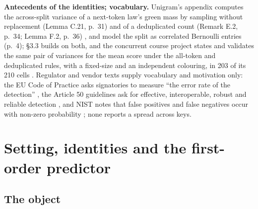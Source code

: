 \documentclass[11pt,letterpaper]{article}
\begin{document}
\textbf{Antecedents of the identities; vocabulary.} Unigram's appendix computes the across-split variance of a next-token law's green mass by sampling without replacement (Lemma C.21, p.~31) and of a deduplicated count (Remark E.2, p.~34; Lemma F.2, p.~36) \citep{zhao2024unigram}, and \citet{gloaguen2026unified} model the split as correlated Bernoulli entries (p.~4); \S{}3.3 builds on both, and the concurrent course project states and validates the same pair of variances for the mean score under the all-token and deduplicated rules, with a fixed-size and an independent colouring, in 203 of its 210 cells \citep{yukhimchuk2026keylottery}. Regulator and vendor texts supply vocabulary and motivation only: the EU Code of Practice asks signatories to measure ``the error rate of the detection'' \citep[Measure 3.2, p.~17]{ec2026code}, the Article 50 guidelines ask for effective, interoperable, robust and reliable detection \citep[p.~26]{ec2026guidelines}, and NIST notes that false positives and false negatives occur with non-zero probability \citep[p.~12]{nist2024ai1004}; none reports a spread across keys.

\hypertarget{setting-identities-and-the-first-order-predictor}{%
\section{Setting, identities and the first-order predictor}\label{setting-identities-and-the-first-order-predictor}}

\hypertarget{the-object}{%
\subsection{The object}\label{the-object}}
\end{document}
